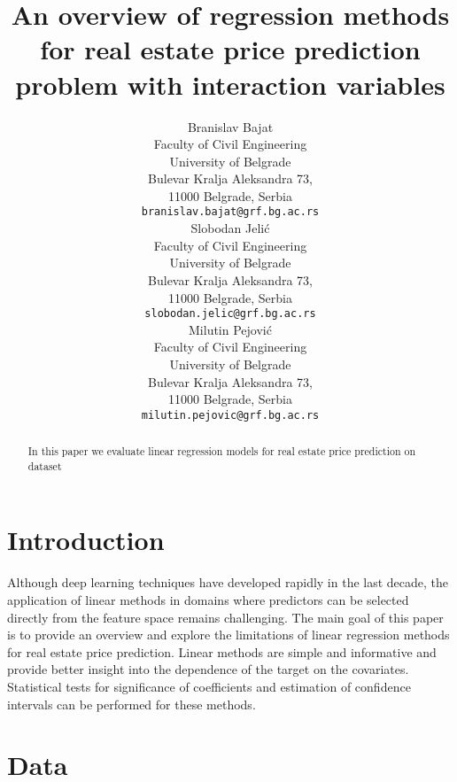 \documentclass{article}
\title{An overview of regression methods for real estate price prediction problem with interaction variables}
\author{
 Branislav Bajat \\
  Faculty of Civil Engineering\\
  University of Belgrade\\
  Bulevar Kralja Aleksandra 73,\\
  11000 Belgrade, Serbia\\
  \texttt{branislav.bajat@grf.bg.ac.rs} \\
  \And
  Slobodan Jelić \\
  Faculty of Civil Engineering\\
  University of Belgrade\\
  Bulevar Kralja Aleksandra 73,\\
  11000 Belgrade, Serbia\\
  \texttt{slobodan.jelic@grf.bg.ac.rs} \\
\And
Milutin Pejović \\
Faculty of Civil Engineering\\
University of Belgrade\\
Bulevar Kralja Aleksandra 73,\\
11000 Belgrade, Serbia\\
\texttt{milutin.pejovic@grf.bg.ac.rs} \\
}
\begin{document}
\maketitle
\begin{abstract}
In this paper we evaluate linear regression models for real estate price prediction on dataset 
\end{abstract}




\section{Introduction}
Although deep learning techniques have developed rapidly in the last decade, the application of linear methods in domains where predictors can be selected directly from the feature space remains challenging. The main goal of this paper is to provide an overview and explore the limitations of linear regression methods for real estate price prediction. Linear methods are simple and informative and provide better insight into the dependence of the target on the covariates. Statistical tests for significance of coefficients and estimation of confidence intervals can be performed for these methods.
\section{Data}
\end{document}
